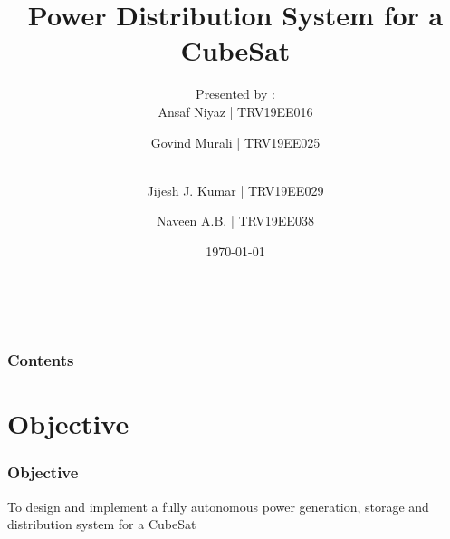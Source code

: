 \documentclass[aspectratio=169]{beamer}
\begin{document}
	\title{Power Distribution System for a CubeSat}
	
	\subtitle{}
	
	
	\author{Presented by :\\Ansaf Niyaz | TRV19EE016  \and Govind Murali | TRV19EE025  \and \\Jijesh J. Kumar | TRV19EE029  \and Naveen A.B. | TRV19EE038}
	
	\date{\today}
	
	
	{%
		\hbox{%
			\hbox{\insertslidenavigationsymbol}
			\hbox{\insertframenavigationsymbol}
			\hbox{\insertsubsectionnavigationsymbol}
			\hbox{\insertsectionnavigationsymbol}
			\hbox{\insertdocnavigationsymbol}
			\hbox{\insertbackfindforwardnavigationsymbol}}%
	}
	\begin{frame}[plain]
		\maketitle
	\end{frame}
	
	
	\begin{frame}
		\frametitle{Contents}
		
		
		
		
		\tableofcontents
	\end{frame}
	
	
	
	\section{Objective}
	\begin{frame}
		
		\frametitle{Objective}
		\centering
		To design and implement a fully autonomous power generation, storage and distribution system for a CubeSat 
		
		
		
	\end{frame}
	
	
	
	
	
	
			
\end{document}
